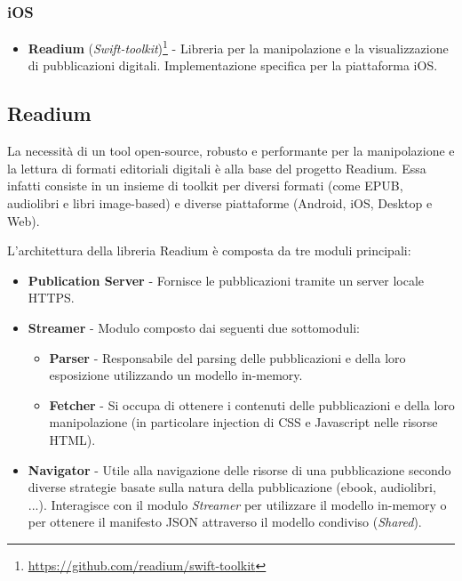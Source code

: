 \subsubsection*{iOS}
\begin{itemize}
    \item \textbf{Readium} (\textit{Swift-toolkit})\footnote{\href{https://github.com/readium/swift-toolkit}{https://github.com/readium/swift-toolkit}} - Libreria per la manipolazione e la visualizzazione di pubblicazioni digitali. Implementazione specifica per la piattaforma iOS. 
\end{itemize}
    
\subsection{Readium}
La necessità di un tool open-source, 
robusto e performante per la manipolazione e la lettura di formati editoriali digitali è alla base del progetto Readium. 
Essa infatti consiste in un insieme di toolkit per diversi formati (come EPUB, audiolibri e libri image-based) e diverse piattaforme (Android, iOS, Desktop e Web).

L'architettura della libreria Readium è composta da tre moduli principali:

\begin{itemize}
    \item \textbf{Publication Server} - Fornisce le pubblicazioni tramite un server locale HTTPS.
    
    \item \textbf{Streamer} - Modulo composto dai seguenti due sottomoduli:
    \begin{itemize}
        \item \textbf{Parser} - Responsabile del parsing delle pubblicazioni e della loro esposizione utilizzando un modello in-memory.
        
        \item \textbf{Fetcher} - Si occupa di ottenere i contenuti delle pubblicazioni e della loro manipolazione (in particolare injection di CSS e Javascript nelle risorse HTML).
    \end{itemize}
    
    \item \textbf{Navigator} - Utile alla navigazione delle risorse di una pubblicazione secondo diverse strategie basate sulla natura della pubblicazione (ebook, audiolibri, ...). Interagisce con il modulo \textit{Streamer} per utilizzare il modello in-memory o per ottenere il manifesto JSON attraverso il modello condiviso (\textit{Shared}).
\end{itemize}

